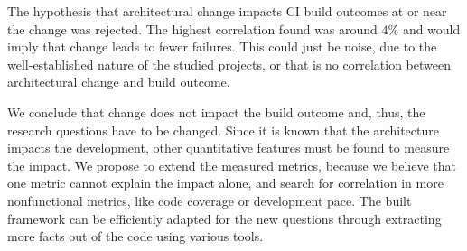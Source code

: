 \documentclass[sigplan, anonymous, review]{acmart}
\begin{document}
The hypothesis that architectural change impacts CI build outcomes at or near the change was rejected. The highest correlation found was around $4\%$ and would imply that change leads to fewer failures. This could just be noise, due to the well-established nature of the studied projects, or that is no correlation between architectural change and build outcome. 

We conclude that change does not impact the build outcome and, thus, the research questions have to be changed. Since it is known that the architecture impacts the development, other quantitative features must be found to measure the impact. We propose to extend the measured metrics, because we believe that one metric cannot explain the impact alone, and search for correlation in more nonfunctional metrics, like code coverage or development pace.
The built framework can be efficiently adapted for the new questions through extracting more facts out of the code using various tools. 



\end{document}
